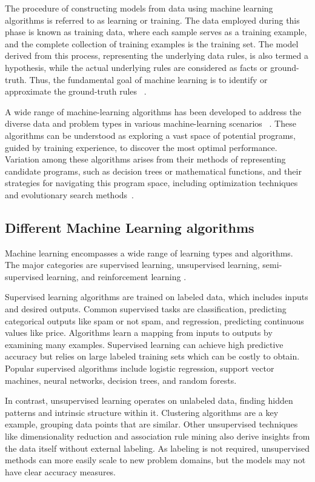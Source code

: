 The procedure of constructing models from data using machine learning algorithms is referred to as learning or training. The data employed during this phase is known as training data, where each sample serves as a training example, and the complete collection of training examples is the training set. The model derived from this process, representing the underlying data rules, is also termed a hypothesis, while the actual underlying rules are considered as facts or ground-truth. Thus, the fundamental goal of machine learning is to identify or approximate the ground-truth rules ~\cite{zhou2021machine}.

A wide range of machine-learning algorithms has been developed to address the diverse data and problem types in various machine-learning scenarios ~\cite{hastie2009elements, murphy2012machine}. These algorithms can be understood as exploring a vast space of potential programs, guided by training experience, to discover the most optimal performance. Variation among these algorithms arises from their methods of representing candidate programs, such as decision trees or mathematical functions, and their strategies for navigating this program space, including optimization techniques and evolutionary search methods~\cite{jordan2015machine}.

\subsection{Different Machine Learning algorithms}
Machine learning encompasses a wide range of learning types and algorithms. The major categories are supervised learning, unsupervised learning, semi-supervised learning, and reinforcement learning \cite{Alpaydin14}.

Supervised learning algorithms are trained on labeled data, which includes inputs and desired outputs. Common supervised tasks are classification, predicting categorical outputs like spam or not spam, and regression, predicting continuous values like price. Algorithms learn a mapping from inputs to outputs by examining many examples. Supervised learning can achieve high predictive accuracy but relies on large labeled training sets which can be costly to obtain. Popular supervised algorithms include logistic regression, support vector machines, neural networks, decision trees, and random forests.

In contrast, unsupervised learning operates on unlabeled data, finding hidden patterns and intrinsic structure within it. Clustering algorithms are a key example, grouping data points that are similar. Other unsupervised techniques like dimensionality reduction and association rule mining also derive insights from the data itself without external labeling. As labeling is not required, unsupervised methods can more easily scale to new problem domains, but the models may not have clear accuracy measures.

